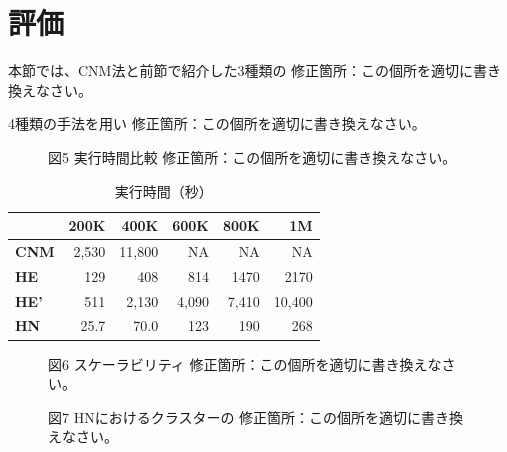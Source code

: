\documentclass [a4j,11pt] {jsarticle}
\begin{document}
\section {評価}
\label {sect: evaluation}

\begin {空欄ブロック}{本節では、CNM法と前節で紹介した3種類の}
修正箇所：この個所を適切に書き換えなさい。
\end {空欄ブロック}

\begin {空欄ブロック}{4種類の手法を用い}
修正箇所：この個所を適切に書き換えなさい。
\end {空欄ブロック}

\begin{figure}[htbp]
\begin {空欄ブロック}{図5 実行時間比較}
修正箇所：この個所を適切に書き換えなさい。
\end {空欄ブロック}
\end{figure}

\begin {table}
  \caption {実行時間（秒）}
  \label {tbl: elapsed time}
  \begin {center}
    \begin {tabular}{lrrrrr} \\ \hline
          & 200K & 400K & 600K & 800K & 1M \\ \hline
      \textbf {CNM}& 2,530 & 11,800 & NA & NA & NA \\
      \textbf {HE}  & 129  & 408  & 814  & 1470 & 2170 \\
      \textbf {HE'} & 511  & 2,130 & 4,090 & 7,410 & 10,400 \\
      \textbf {HN}  & 25.7 & 70.0 & 123  & 190  & 268 \\
      \hline
    \end {tabular}
  \end {center}
\end {table}

\begin{figure}[htbp]
\begin {空欄ブロック}{図6 スケーラビリティ}
修正箇所：この個所を適切に書き換えなさい。
\end {空欄ブロック}
\end{figure}

\begin{figure}[htbp]
\begin {空欄ブロック}{図7 HNにおけるクラスターの}
修正箇所：この個所を適切に書き換えなさい。
\end {空欄ブロック}
\end{figure}
\end{document}
